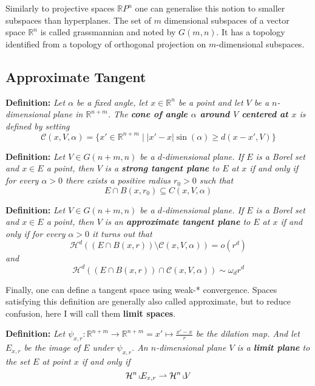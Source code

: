 Similarly to projective spaces $\mathbb{R}P^n$ one can generalise this notion to
smaller subspaces than hyperplanes. The set of $m$ dimensional subspaces of a
vector space $\mathbb{R}^n$ is called grassmannian and noted by $G(m,n)$. It
has a topology identified from a topology of orthogonal projection on
$m$-dimensional subspaces.

\subsection{Approximate Tangent}

\textbf{Definition:} \textit{Let $\alpha$ be a fixed angle, let $x\in\mathbb R^n$
be a point and let $V$ be a $n$-dimensional plane in $\mathbb R^{n+m}$. The \textbf{
cone of angle $\alpha$ around $V$ centered at $x$} is defined by setting
\[\mathcal C(x,V,\alpha)=\{x'\in\mathbb R^{n+m}\;|\; |x′−x|\sin(\alpha)\geq d(x−x′, V)\}\]
}

\vspace{2ex}
\textbf{Definition:} \textit{Let $V\in G(n+m, n)$ be a $d$-dimensional plane.
If $E$ is a Borel set and $x\in E$ a point, then $V$ is a \textbf{strong tangent plane}
to $E$ at $x$ if and only if for every $\alpha >0$ there exists a positive
radius $r_0 >0$ such that
\[E∩B(x, r_0)\subseteq C(x, V, \alpha)\]
}

\vspace{2ex}
\textbf{Definition:} \textit{Let $V\in G(n+m, n)$ be a $d$-dimensional plane.
If $E$ is a Borel set and $x\in E$ a point, then $V$ is an \textbf{approximate tangent
plane} to $E$ at $x$ if and only if for every $\alpha>0$ it turns out that
\[\mathcal H^d((E∩B(x,r))\setminus\mathcal C(x, V, \alpha)) = o(r^d)\]
and
\[\mathcal H^d((E∩B(x, r))∩\mathcal C(x, V, α))\sim \omega_dr^d\]
}

\vspace{2ex}
Finally, one can define a tangent space using weak-* convergence. Spaces
satisfying this definition are generally also called approximate, but to reduce
confusion, here I will call them \textbf{limit spaces}.

\vspace{1ex}
\textbf{Definition:} \textit{Let $\psi_{x,r}:\mathbb R^{n+m}\rightarrow \mathbb
R^{n+m}=x'\mapsto \frac{x'-x}{r}$ be the dilation map. And let $E_{x,r}$ be the
image of $E$ under $\psi_{x,r}$. An $n$-dimensional plane $V$ is a
\textbf{limit plane} to the set $E$ at point $x$ if and only if
\[\mathcal H^n\,\llcorner\hspace{-1mm}E_{x,r}\rightharpoonup\mathcal H^n\,\llcorner\hspace{-1mm}V\]}

